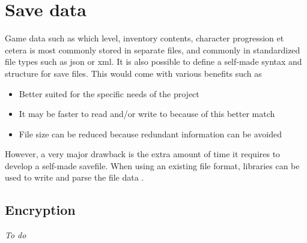 \section{Save data}
Game data such as which level, inventory contents, character progression et cetera is most commonly stored in separate files, and commonly in standardized file types such as json or xml.
It is also possible to define a self-made syntax and structure for save files. This would come with various benefits such as
\begin{itemize}
    \item Better suited for the specific needs of the project
    \item It may be faster to read and/or write to because of this better match
    \item File size can be reduced because redundant information can be avoided
\end{itemize}
However, a very major drawback is the extra amount of time it requires to develop a self-made savefile.
When using an existing file format, libraries can be used to write and parse the file data \cite{stackUser35344} \cite{LazyFoo}.

\subsection{Encryption}
\textit{To do}
